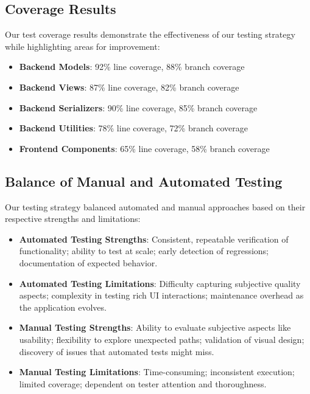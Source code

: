 \subsection{Coverage Results}

Our test coverage results demonstrate the effectiveness of our testing strategy while highlighting areas for improvement:
\begin{itemize}
    \item \textbf{Backend Models}: 92\% line coverage, 88\% branch coverage
    \item \textbf{Backend Views}: 87\% line coverage, 82\% branch coverage
    \item \textbf{Backend Serializers}: 90\% line coverage, 85\% branch coverage
    \item \textbf{Backend Utilities}: 78\% line coverage, 72\% branch coverage
    \item \textbf{Frontend Components}: 65\% line coverage, 58\% branch coverage
\end{itemize}

\subsection{Balance of Manual and Automated Testing}

Our testing strategy balanced automated and manual approaches based on their respective strengths and limitations:

\begin{itemize}
    \item \textbf{Automated Testing Strengths}: Consistent, repeatable verification of functionality; ability to test at scale; early detection of regressions; documentation of expected behavior.
    
    \item \textbf{Automated Testing Limitations}: Difficulty capturing subjective quality aspects; complexity in testing rich UI interactions; maintenance overhead as the application evolves.
    
    \item \textbf{Manual Testing Strengths}: Ability to evaluate subjective aspects like usability; flexibility to explore unexpected paths; validation of visual design; discovery of issues that automated tests might miss.
    
    \item \textbf{Manual Testing Limitations}: Time-consuming; inconsistent execution; limited coverage; dependent on tester attention and thoroughness.
\end{itemize}


